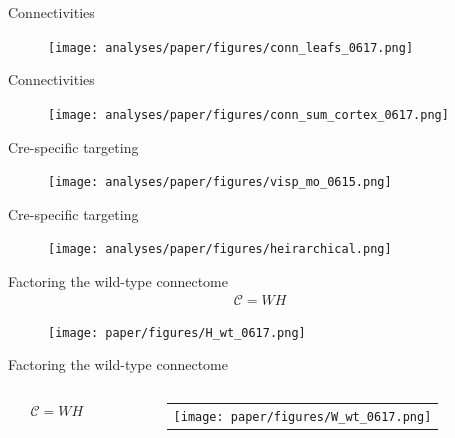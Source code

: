 \documentclass{beamer}
\begin{document}
\begin{frame}{Connectivities}
\begin{figure}[H]
\centering
    \label{fig:full_wt}
    \texttt{[image: analyses/paper/figures/conn\_leafs\_0617.png]}
        \newline
   \end{figure}
\end{frame}

\begin{frame}{Connectivities}
\begin{figure}[H]
\centering
    \label{fig:cortex_wt}
    \texttt{[image: analyses/paper/figures/conn\_sum\_cortex\_0617.png]}
   \end{figure}
\end{frame}


\begin{frame}{Cre-specific targeting}

\begin{figure}[H]
\label{fig:ct_spc}
    \texttt{[image: analyses/paper/figures/visp\_mo\_0615.png]} 
\label{fig:data_ct}
\end{figure}
\end{frame}

\begin{frame}{Cre-specific targeting}
\begin{figure}[H]
 \label{fig:ct_clust}
    \texttt{[image: analyses/paper/figures/heirarchical.png]}
\label{fig:data_ct}
\end{figure}
\end{frame}

\begin{frame}{Factoring the wild-type connectome}
\begin{eqnarray*}
\mathcal C = WH
\end{eqnarray*}
\begin{figure}[H]
\texttt{[image: paper/figures/H\_wt\_0617.png]}
\label{fig:H}
\end{figure}
\end{frame}

\begin{frame}{Factoring the wild-type connectome}
\begin{columns}
\begin{column}{.5\textwidth}
\begin{eqnarray*}
\mathcal C = WH
\end{eqnarray*}
\end{column}
\begin{column}{.5\textwidth}
\begin{figure}[H]
\begin{tabular}[t]{c}
\texttt{[image: paper/figures/W\_wt\_0617.png]}
\label{fig:W}
\end{tabular}
\label{fig:nmf_results}
\end{figure}
\end{column}
\end{columns}
\end{frame}
\end{document}

